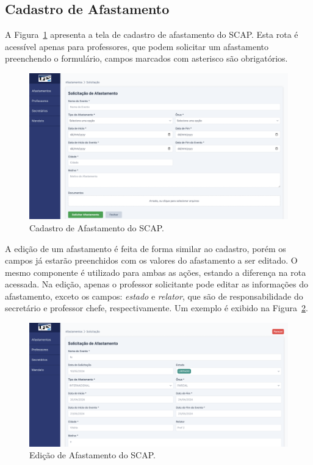 \subsection{Cadastro de Afastamento}
\label{subsec-projeto-cadastro-afastamento}

A Figura~\ref{fig-cadastro-afastamento} apresenta a tela de cadastro de afastamento do SCAP. Esta rota
é acessível apenas para professores, que podem solicitar um afastamento preenchendo o formulário,
campos marcados com asterisco são obrigatórios. 

\begin{figure}[h!]
    \centering
    \includegraphics[width=\textwidth]{figuras/prints-app/fig-solicitar-afastamento.png}
    \caption{Cadastro de Afastamento do SCAP.}
    \label{fig-cadastro-afastamento}
\end{figure}

A edição de um afastamento é feita de forma similar ao cadastro, porém os campos já estarão preenchidos com os valores
do afastamento a ser editado. O mesmo componente é utilizado para ambas as ações, estando a diferença na rota acessada.
Na edição, apenas o professor solicitante pode editar as informações do afastamento, exceto os campos:
\textit{estado} e \textit{relator}, que são de responsabilidade do secretário e professor chefe, respectivamente. Um exemplo é exibido na Figura~\ref{fig-editar-afastamento}.

\begin{figure}[h!]
    \centering
    \includegraphics[width=\textwidth]{figuras/prints-app/fig-editar-afastamento.png}
    \caption{Edição de Afastamento do SCAP.}
    \label{fig-editar-afastamento}
\end{figure}

